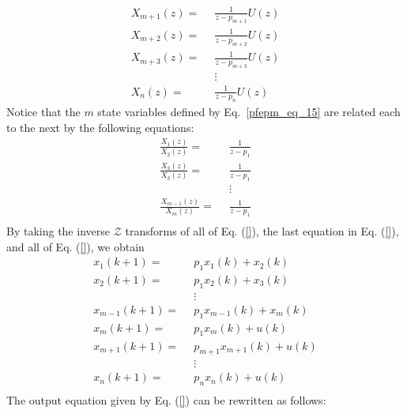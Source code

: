 \documentclass[12pt,a4paper,oneside]{book}
\begin{document}
\begin{onehalfspace}
\begin{equation}
	\begin{aligned}
		X_{m+1}(z)= & \enspace  \frac{1}{z-p_{m+1}}U(z) \\[6pt]
		X_{m+2}(z)= & \enspace  \frac{1}{z-p_{m+2}}U(z) \\[6pt]
		X_{m+3}(z)= & \enspace  \frac{1}{z-p_{m+3}}U(z) \\[6pt]
		& \enspace \vdots \\[6pt]
		X_n(z)= & \enspace  \frac{1}{z-p_n}U(z) 
	\end{aligned}
\end{equation}
Notice that the $m$ state variables defined by Eq.~\eqref{pfepm_eq_15} are 
related each to the next by the following equations:
\begin{equation}\label{pfepm_eq_16}
	\begin{aligned}
		\frac{X_{1}(z)}{X_2(z)}= & \enspace  \frac{1}{z-p_{1}} \\[6pt]
		\frac{X_{2}(z)}{X_3(z)}= & \enspace  \frac{1}{z-p_{1}} \\[6pt]
		& \enspace \vdots \\[6pt]
		\frac{X_{m-1}(z)}{X_m(z)}= & \enspace  \frac{1}{z-p_{1}} \\[6pt]
	\end{aligned}
\end{equation}
By taking the inverse $\mathcal{Z}$ transforms of all of Eq. (\ref{}), the 
last equation in Eq. (\ref{}), and all of Eq. (\ref{}), we obtain
\begin{equation}\label{pfepm_eq_17}
	\begin{aligned}
		x_1(k+1) =& \enspace p_1x_1(k) + x_2(k) \\[6pt]
		x_2(k+1) =& \enspace p_1x_2(k) + x_3(k) \\[6pt]
		& \enspace\vdots \\[6pt]
		x_{m-1}(k+1) =& \enspace p_1x_{m-1}(k) + x_m(k) \\[6pt]
		x_{m}(k+1) =& \enspace p_1x_{m}(k) + u(k) \\[6pt]
		x_{m+1}(k+1) =& \enspace p_{m+1}x_{m+1}(k) + u(k) \\[6pt]
		& \enspace\vdots \\[6pt]
		x_{n}(k+1) =& \enspace p_{n}x_{n}(k) + u(k) \\[6pt]
	\end{aligned}
\end{equation}
The output equation given by Eq. (\ref{}) can be rewritten as follows:
\begin{equation*}\label{pfepm_eq_18}
	\begin{aligned}

\end{aligned}
\end{equation*}
\end{onehalfspace}
\end{document}
